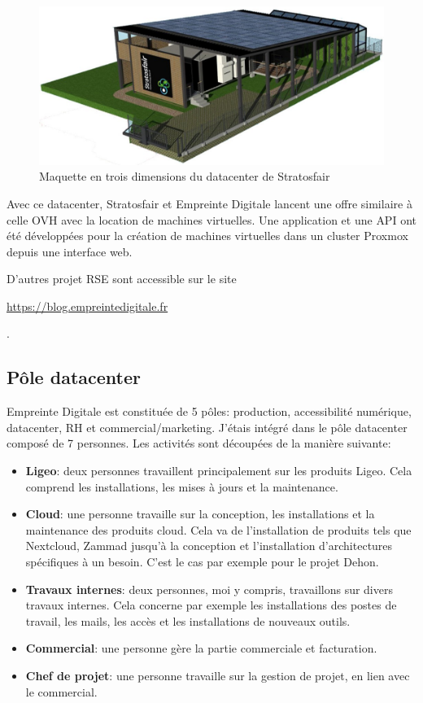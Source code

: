 \documentclass[12pt, a4paper, twoside]{article}
\begin{document}
\begin{figure}[!ht]
    \centering
    \includegraphics[width=\textwidth]{src/scheme_strato.jpg}
    \caption{Maquette en trois dimensions du datacenter de Stratosfair}
    \label{fig:strato}
\end{figure}

Avec ce datacenter, Stratosfair et Empreinte Digitale lancent une offre similaire à celle OVH avec la location de machines virtuelles.
Une application et une \gls{API} ont été développées pour la création de machines virtuelles dans un \gls{cluster} \gls{Proxmox} depuis une interface web.

D'autres projet \gls{RSE} sont accessible sur le site \begin{hilite}\url{https://blog.empreintedigitale.fr}\end{hilite}.

\subsection{Pôle datacenter}
Empreinte Digitale est constituée de 5 pôles: production, accessibilité numérique, datacenter, RH et commercial/marketing.
J'étais intégré dans le pôle datacenter composé de 7 personnes. 
\noindent%
Les activités sont découpées de la manière suivante:
\begin{itemize}
    \item \textbf{Ligeo}: deux personnes travaillent principalement sur les produits Ligeo. 
    Cela comprend les installations, les mises à jours et la maintenance.
    \item \textbf{Cloud}: une personne travaille sur la conception, les installations et la maintenance des produits cloud. 
    Cela va de l'installation de produits tels que \gls{Nextcloud}, Zammad jusqu'à la conception et l'installation d'architectures spécifiques à un besoin. 
    C'est le cas par exemple pour le projet Dehon.
    \item \textbf{Travaux internes}: deux personnes, moi y compris, travaillons sur divers travaux internes. 
    Cela concerne par exemple les installations des postes de travail, les mails, les accès et les installations de nouveaux outils.
    \item \textbf{Commercial}: une personne gère la partie commerciale et facturation.
    \item \textbf{Chef de projet}: une personne travaille sur la gestion de projet, en lien avec le commercial.
\end{itemize}
\end{document}
